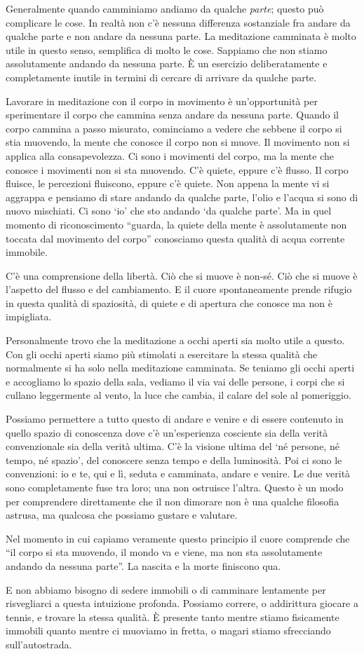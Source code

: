Generalmente quando camminiamo andiamo da qualche \textit{parte}; questo può complicare le cose. In realtà non c'è nessuna differenza sostanziale fra andare da qualche parte e non andare da nessuna parte. La meditazione camminata è molto utile in questo senso, semplifica di molto le cose. Sappiamo che non stiamo assolutamente andando da nessuna parte. È un esercizio deliberatamente e completamente inutile in termini di cercare di arrivare da qualche parte. 

Lavorare in meditazione con il corpo in movimento è un'opportunità per sperimentare il corpo che cammina senza andare da nessuna parte. Quando il corpo cammina a passo misurato, cominciamo a vedere che sebbene il corpo si stia muovendo, la mente che conosce il corpo non si muove. Il movimento non si applica alla consapevolezza. Ci sono i movimenti del corpo, ma la mente che conosce i movimenti non si sta muovendo. C'è quiete, eppure c'è flusso. Il corpo fluisce, le percezioni fluiscono, eppure c'è quiete. Non appena la mente vi si aggrappa e pensiamo di stare andando da qualche parte, l'olio e l'acqua si sono di nuovo mischiati. Ci sono `io' che sto andando `da qualche parte'. Ma in quel momento di riconoscimento ``guarda, la quiete della mente è assolutamente non toccata dal movimento del corpo'' conosciamo questa qualità di acqua corrente immobile.

C'è una comprensione della libertà. Ciò che si muove è non-sé. Ciò che si muove è l'aspetto del flusso e del cambiamento. E il cuore spontaneamente prende rifugio in questa qualità di spaziosità, di quiete e di apertura che conosce ma non è impigliata.

Personalmente trovo che la meditazione a occhi aperti sia molto utile a questo. Con gli occhi aperti siamo più stimolati a esercitare la stessa qualità che normalmente si ha solo nella meditazione camminata. Se teniamo gli occhi aperti e accogliamo lo spazio della sala, vediamo il via vai delle persone, i corpi che si cullano leggermente al vento, la luce che cambia, il calare del sole al pomeriggio.

Possiamo permettere a tutto questo di andare e venire e di essere contenuto in quello spazio di conoscenza dove c'è un'esperienza cosciente sia della verità convenzionale sia della verità ultima. C'è la visione ultima del `né persone, né tempo, né spazio', del conoscere senza tempo e della luminosità. Poi ci sono le convenzioni: io e te, qui e lì, seduta e camminata, andare e venire. Le due verità sono completamente fuse tra loro; una non ostruisce l'altra. Questo è un modo per comprendere direttamente che il non dimorare non è una qualche filosofia astrusa, ma qualcosa che possiamo gustare e valutare.

Nel momento in cui capiamo veramente questo principio il cuore comprende che ``il corpo si sta muovendo, il mondo va e viene, ma non sta assolutamente andando da nessuna parte''. La nascita e la morte finiscono qua.

E non abbiamo bisogno di sedere immobili o di camminare lentamente per risvegliarci a questa intuizione profonda. Possiamo correre, o addirittura giocare a tennis, e trovare la stessa qualità. È presente tanto mentre stiamo fisicamente immobili quanto mentre ci muoviamo in fretta, o magari stiamo sfrecciando sull'autostrada. 
